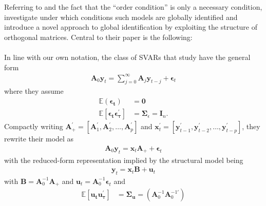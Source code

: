\documentclass[a4paper,11pt,listof=nochaptergap,oneside,pointednumbers,bibtotoc,bigheadings,liststotoc]{scrbook}
\theoremstyle{mysatz}
\theoremstyle{mydefinition}
\theoremstyle{mytheorem}
\theoremstyle{mybemerkung}
\newcommand{\vect}[1]{\boldsymbol{\mathbf{#1}}}
\begin{document}
Referring to \citet{rothenberg:71} and the fact that the ``order condition'' is only a necessary condition, \citet{rubioetal:10} investigate under which conditions such models are globally identified and introduce a novel approach to global identification by exploiting the structure of orthogonal matrices. Central to their paper is the following: \\
\\
In line with our own notation, the class of SVARs that \citet{rubioetal:10} study have the general form
\begin{equation} \label{eq:svar_1}
\begin{split}
	\vect{A}_0 \vect{y}_t = \sum\limits_{j=0}^\infty \vect{A}_j\vect{y}_{t-j} + \vect{\epsilon}_t
\end{split}								
\end{equation}
where they assume 
\begin{equation}\label{eq:svar_2}
\begin{split}
	\mathbb{E}(\vect{\epsilon_t}) &  = \vect{0}  \\
	\mathbb{E}[\vect{\epsilon_t}\vect{\epsilon_{\tau}^'}] & = \vect{\Sigma}_\epsilon = \vect{I}_n.
\end{split}								
\end{equation}
Compactly writing $\vect{A}_{+}^' = [\vect{A}_1^', \vect{A}_2^', \dots, \vect{A}_p^']$ and $\vect{x}_{t}^' = [\vect{y}_{t-1}^', \vect{y}_{t-2}^', \dots, \vect{y}_{t-p}^']$, they rewrite their model as
\begin{equation}\label{eq:svar_3}
\begin{split}
	\vect{A}_0 \vect{y}_t =  \vect{x}_t \vect{A}_+ + \vect{\epsilon}_t
\end{split}								
\end{equation}
with the reduced-form representation implied by the structural model being
\begin{equation}\label{eq:svar_4}
\begin{split}
	 \vect{y}_t =  \vect{x}_t \vect{B} + \vect{u}_t
\end{split}								
\end{equation}
with $\vect{B} = \vect{A}_0^{-1}\vect{A}_+$ and $\vect{u}_t = \vect{A}_0^{-1}\vect{\epsilon}_t$ and
	\begin{equation} \label{eq:svar_5}
	\begin{split}
		\mathbb{E}[\vect{u_t}\vect{u_{\tau}^'}] & = 
      												\vect{\Sigma_u} = (\vect{A}_0^{-1}\vect{A}_0^{-1'})
	\end{split}								
	\end{equation}	
\end{document}
